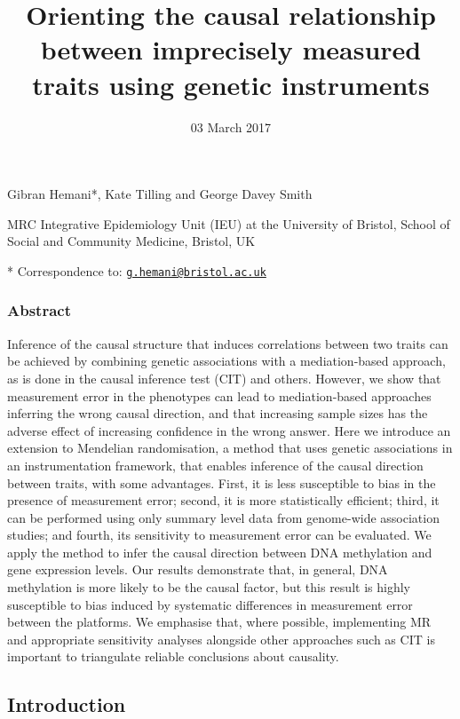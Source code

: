 \documentclass[]{article}
\title{Orienting the causal relationship between imprecisely measured traits
using genetic instruments}
\author{}
\date{03 March 2017}
\begin{document}
\maketitle

Gibran Hemani*, Kate Tilling and George Davey Smith

MRC Integrative Epidemiology Unit (IEU) at the University of Bristol,
School of Social and Community Medicine, Bristol, UK

* Correspondence to:
\href{mailto:g.hemani@bristol.ac.uk}{\nolinkurl{g.hemani@bristol.ac.uk}}

\subsubsection{Abstract}\label{abstract}

Inference of the causal structure that induces correlations between two
traits can be achieved by combining genetic associations with a
mediation-based approach, as is done in the causal inference test (CIT)
and others. However, we show that measurement error in the phenotypes
can lead to mediation-based approaches inferring the wrong causal
direction, and that increasing sample sizes has the adverse effect of
increasing confidence in the wrong answer. Here we introduce an
extension to Mendelian randomisation, a method that uses genetic
associations in an instrumentation framework, that enables inference of
the causal direction between traits, with some advantages. First, it is
less susceptible to bias in the presence of measurement error; second,
it is more statistically efficient; third, it can be performed using
only summary level data from genome-wide association studies; and
fourth, its sensitivity to measurement error can be evaluated. We apply
the method to infer the causal direction between DNA methylation and
gene expression levels. Our results demonstrate that, in general, DNA
methylation is more likely to be the causal factor, but this result is
highly susceptible to bias induced by systematic differences in
measurement error between the platforms. We emphasise that, where
possible, implementing MR and appropriate sensitivity analyses alongside
other approaches such as CIT is important to triangulate reliable
conclusions about causality.

\subsection{Introduction}\label{introduction}
\end{document}
